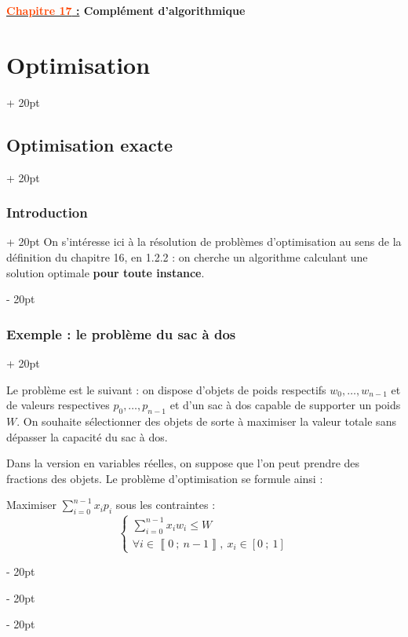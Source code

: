 \documentclass[a4paper, 12pt, twoside]{article}
\newcommand{\Emph}{\textcolor{ff4500}}
\newcommand{\seg}[2]{\left[ #1\ ;\ #2 \right]}
\newcommand{\nset}[2]{\left\llbracket #1\ ;\ #2 \right\rrbracket}
\renewcommand{\le}{\leqslant}
\newcommand{\ind}[1][20pt]{\advance\leftskip + #1}
\newcommand{\deind}[1][20pt]{\advance\leftskip - #1}
\newenvironment{indt}[2][20pt]{#2 \par \ind[#1]}{\par \deind} %
\newcommand{\thetitle}[2]{\begin{center}\textbf{{\LARGE \underline{\Emph{#1} :}} {\Large #2}}\end{center}}
\newcommand{\1}{\mathbbm 1}
\begin{document}
    
    \thetitle{Chapitre 17}{Complément d'algorithmique}
    
    \tableofcontents
    \newpage
    
    \begin{indt}{\section{Optimisation}}
        \begin{indt}{\subsection{Optimisation exacte}}
            \begin{indt}{\subsubsection{Introduction}}
                On s'intéresse ici à la résolution de problèmes d'optimisation au sens de la définition du chapitre 16, en 1.2.2 : on cherche un algorithme calculant une solution optimale \textbf{pour toute instance}.
            \end{indt}

            \vspace{12pt}
            
            \begin{indt}{\subsubsection{Exemple : le problème du sac à dos}}
                \label{1.1.2}

                Le problème est le suivant : on dispose d'objets de poids respectifs $w_0, \ldots, w_{n - 1}$ et de valeurs respectives $p_0, \ldots, p_{n - 1}$ et d'un sac à dos capable de supporter un poids $W$. On souhaite sélectionner des objets de sorte à maximiser la valeur totale sans dépasser la capacité du sac à dos.

                Dans la version en variables réelles, on suppose que l'on peut prendre des fractions des objets. Le problème d'optimisation se formule ainsi :

                Maximiser $\displaystyle \sum_{i = 0}^{n - 1} x_i p_i$ sous les contraintes :
                \[
                    \begin{cases}
                        \displaystyle
                        \sum_{i = 0}^{n - 1} x_i w_i \le W
                        \\
                        \forall i \in \nset 0 {n - 1},\ x_i \in \seg 0 1
                    \end{cases}
                \]


\end{indt}
\end{indt}
\end{indt}
\end{document}
